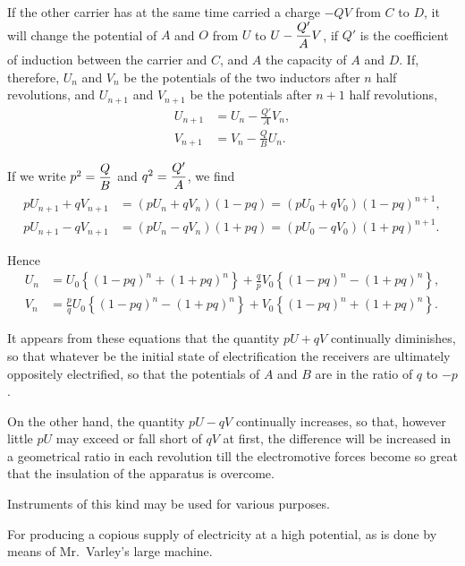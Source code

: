 \documentclass[12pt,oneside]{book}[2021/10/04]
\newcommand{\xp}{\rule[-2.0ex]{0pt}{5.2ex}}
\newcommand{\¬}{\hphantom{0}}
\begin{document}
\hypertarget{198:1}{}
If the other carrier has at the same time carried a charge \(-QV\)
from \(C\) to \(D\), it will change the potential of \(A\) and \(O\) from \(U\) to
\(U - \xp\dfrac{Q'}{A} V\), if \(Q'\) is the coefficient of induction between the carrier
and \(C\), and \(A\) the capacity of \(A\) and \(D\). If, therefore, \(U_n\) and \(V_n\)
be the potentials of the two inductors after \(n\) half revolutions, and
\(U_{n+1}\) and \(V_{n+1}\) be the potentials after \(n + 1\) half revolutions,
\[
  \begin{aligned}
    U_{n + 1} &= U_n - \frac {Q'}{A} V_n,\\
    V_{n + 1} &= V_n - \frac {Q}{B} U_n.
  \end{aligned}
\]

If we write \(p^2 = \xp\dfrac {Q}{B}\) and \(q^2 = \xp\dfrac {Q'}{A}\), we find
\[
  \begin{aligned}
    pU_{n + 1} + qV_{n + 1} &= \left(pU_n + qV_n \right) \left( 1 - pq \right) = \left(pU_0 + qV_0 \right) \left( 1 - pq \right)^{n + 1}, \\
    pU_{n + 1} - qV_{n + 1} &= \left( pU_n - qV_n \right) \left( 1 + pq \right) = \left( pU_0 - qV_0 \right) \left( 1 + pq \right)^{n + 1}.
  \end{aligned}
\]

Hence
\[
  \begin{aligned}
    U_n &= U_0 \left\{ ( 1 - pq )^n + ( 1 + pq )^n \right\} + \frac{q}{p} V_0 \left\{ ( 1 - pq )^n - ( 1 + pq )^n \right\}, \\
    V_n &= \frac{p}{q} U_0 \left\{ ( 1 - pq )^n - ( 1 + pq )^n \right\} + V_0 \left\{ ( 1 - pq )^n + ( 1 + pq )^n \right\}.
  \end{aligned}
\]

It appears from these equations that the quantity \(pU + qV\) continually
diminishes, so that whatever be the initial state of electrification
the receivers are ultimately oppositely electrified, so that
the potentials of \(A\) and \(B\) are in the ratio of \(q\) to \(-p\).

On the other hand, the quantity \(pU - qV\) continually increases,
so that, however little \(pU\) may exceed or fall short of \(qV\) at first,
the difference will be increased in a geometrical ratio in each
revolution till the electromotive forces become so great that the
insulation of the apparatus is overcome.

Instruments of this kind may be used for various purposes.

For producing a copious supply of electricity at a high potential,
as is done by means of Mr.\ Varley's large machine.
\end{document}
